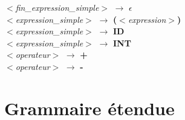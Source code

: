 \documentclass{article}
\begin{document}
\begin{center}
{\begin{minipage}{0.85\textwidth}
$<$\textit{fin\_expression\_simple}$>$ $\rightarrow$ $\epsilon$\\
$<$\textit{expression\_simple}$>$ $\rightarrow$ \textbf{(}$<$\textit{expression}$>$\textbf{)}\\
$<$\textit{expression\_simple}$>$ $\rightarrow$ \textbf{ID} \\
$<$\textit{expression\_simple}$>$ $\rightarrow$ \textbf{INT}\\
$<$\textit{operateur}$>$ $\rightarrow$ \textbf{+}\\
$<$\textit{operateur}$>$ $\rightarrow$ \textbf{-}
\end{minipage}}
\end{center}

\newpage
\section{Grammaire étendue}
\end{document}

